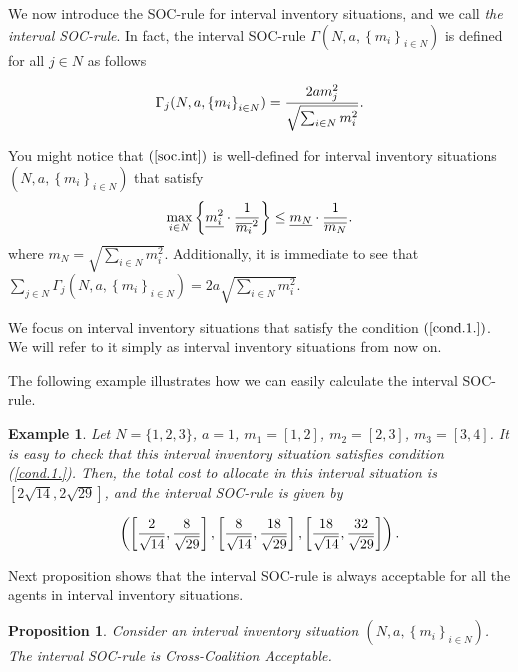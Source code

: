 \documentclass[12pt]{article}
\newtheorem{prop}{\sc Proposition}[section]
\newtheorem{ex}{\sc Example}[section]
\begin{document}
We now introduce the SOC-rule for interval inventory situations, and we call \textit{the interval SOC-rule}. In fact, the interval SOC-rule $\Gamma (N,a,\left\{ m_{i}\right\} _{i\in
N}) $ is defined for all $j\in N$ as follows 

\begin{equation}  \label{soc.int}
\Gamma_j(N,a,\left\{ m_{i}\right\} _{i\in N})=\frac{2am_j^2}{\sqrt{%
\sum_{i\in N}m_{i}^{2}}}.
\end{equation}

\noindent You might notice that $(\ref{soc.int})$ is well-defined for
interval inventory situations $(N,a,\left\{ m_{i}\right\} _{i\in N})$ that
satisfy 
\begin{equation}  \label{cond.1.}
\underset{i\in N}{\max }\left\{ \underline{m_{i}^{2}}\cdot\frac{1}{\overline{%
m_{i}}^{2}}\right\} \leq \underline{m_{N}}\cdot\frac{1}{\overline{m_{N}}}.
\end{equation}
where $m_N=\sqrt{\sum_{i\in N}m_{i}^{2}}.$ Additionally, it is immediate to see that $\sum_{j\in N}\Gamma_j (N,a,\left\{ m_{i}\right\} _{i\in
N})=2a\sqrt{\sum_{i\in N}m_{i}^{2}}.$


\noindent We focus on interval inventory situations that satisfy the
condition $(\ref{cond.1.})$. We will refer to it simply as interval
inventory situations from now on.

The following example illustrates how we can easily calculate the interval SOC-rule.

\begin{ex} 
Let $N=\{1,2,3\}$, $a=1$, $m_{1}=[1,2]$, $m_{2}=[2,3]$, $m_{3}=[3,4]$. It is easy to check that this interval inventory situation satisfies condition (\ref{cond.1.}). Then, the total cost to allocate in this interval situation is $\left[2\sqrt{14},2\sqrt{29} \right]$,  and the interval SOC-rule is given by

\begin{equation*}
\left( \left[ \frac{2}{\sqrt{14}},\frac{8}{\sqrt{29}}\right] ,\left[ \frac{8}{\sqrt{14}},\frac{18}{%
\sqrt{29}}\right] ,\left[ \frac{18}{\sqrt{14}},\frac{32}{\sqrt{29}}\right]
\right).
\end{equation*}
\end{ex}
\medskip

Next proposition shows that the interval SOC-rule is always acceptable for all the agents in interval inventory situations. 

\begin{prop} Consider an interval inventory situation $(N,a,\left\{ m_{i}\right\} _{i\in N})$. The interval SOC-rule is Cross-Coalition Acceptable.  
\end{prop}
\end{document}
